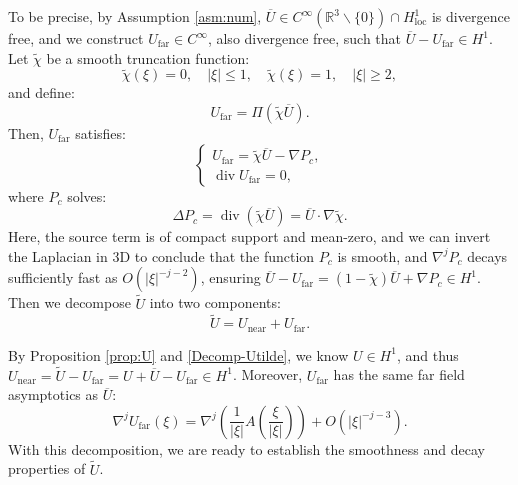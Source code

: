 \documentclass[11pt,a4paper]{article}
\numberwithin{equation}{section}
\newcommand{\cdummy}{\cdot}
\newcommand{\tmop}[1]{\ensuremath{\operatorname{#1}}}
\begin{document}
To be precise,  by Assumption \ref{asm:num}, $\overline{U} \in
  C^{\infty} (\mathbb{R}^3 \backslash \{ 0 \})\cap H^1_{\tmop{loc}}$ is divergence free, and we 
  construct $U_{\tmop{far}} \in C^\infty$, also divergence
  free, such that $\overline{U} - U_{\tmop{far}} \in H^1$.
    Let
  $\widetilde\chi$ be a smooth truncation function:
  \[ \widetilde\chi (\xi) = 0, \quad |\xi| \leqslant 1, \quad \widetilde\chi (\xi) = 1, \quad |\xi| \geqslant
     2, \]and define:
  \begin{equation}
  \label{Definition-Ufar}
   U_{\tmop{far}} = \Pi (\widetilde\chi \overline{U}) . 
   \end{equation}
  Then, $U_{\tmop{far}}$  satisfies:
  \begin{equation}
  \label{Definition-Ufar2} \left\{\begin{array}{l}
       U_{\tmop{far}} = \widetilde\chi \overline{U} - \nabla P_c,
      \\
       \tmop{div} U_{\tmop{far}} = 0,
     \end{array}\right. 
     \end{equation}
  where $P_c$ solves:
  \begin{equation}
  \label{Definition-Pc}
   \Delta P_c = \tmop{div} (\widetilde\chi \overline{U}) = \overline{U} \cdummy \nabla
     \widetilde\chi . 
     \end{equation}
     Here, the source term is of compact support and mean-zero, and we can invert the Laplacian in 3D to conclude that
  the function $P_c$ is smooth, and $\nabla^j P_c$ decays sufficiently fast as
  $O ( {|\xi|^{-j-2}} )$, ensuring $\overline{U} - U_{\tmop{far}} =
  (1 - \widetilde\chi) \overline{U} + \nabla P_c \in H^1$. %
  Then we decompose $\widetilde{U}$ into two components:
  \begin{equation}
  \label{Decomp-Ufar-Unear} \widetilde{U} = U_{\tmop{near}} + U_{\tmop{far}} . 
  \end{equation}
  
  By Proposition \ref{prop:U} and \eqref{Decomp-Utilde}, we know $U\in H^1$, and thus $U_{\tmop{near}}=\widetilde{U}-U_{\tmop{far}} = U+\overline{U} - U_{\tmop{far}}\in H^1$. Moreover, $U_{\tmop{far}}$ has the same far field asymptotics as $\overline{U}$: \begin{equation}
    \label{higher boundary ufar}
\nabla^jU_{\tmop{far}}(\xi)=\nabla^j(\frac{1}{| \xi |} A ( \frac{\xi}{| \xi |} ))+O(|\xi|^{-j-3}).\end{equation}With this decomposition, we are ready to establish the smoothness and decay properties of $\widetilde{U}$.
\end{document}
